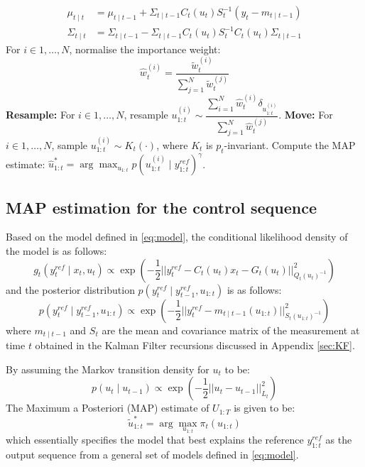 \begin{algorithm}
\begin{algorithmic}[1]
\begin{align}
  \mu_{t \mid t} &=   \mu_{t \mid t -1} +   \Sigma_{t \mid t -1} C_{t}(u_t)S_t^{-1}(y_t - m_{t \mid t-1}) \nonumber\\
  \Sigma_{t \mid t} &=  \Sigma_{t \mid t -1} -\Sigma_{t \mid t -1} C_{t}(u_t)S_t^{-1} C_{t}(u_t)\Sigma_{t \nonumber \mid t -1}
\end{align}
\State For $i \in 1, \ldots, N$, normalise the importance weight:
\begin{equation*}
\hat{w}^{(i)}_t = \dfrac{\tilde{w}^{(i)}_t}{\sum^N_{j=1} \tilde{w}^{(j)}_t}
\end{equation*}
\State \textbf{Resample:} For $i \in 1, \ldots, N$, resample $ u^{(i)}_{1:t} \sim \dfrac{\sum^N_{i=1}\hat{w}^{(i)}_t\delta_{u^{(i)}_{1:t}}}{\sum^N_{j=1} \hat{w}^{(j)}_t}$.
\State \textbf{Move:} For $i \in 1, \ldots, N$, sample $u^{(i)}_{1:t} \sim K_t(\cdot)$, where $K_t$ is $p_t$-invariant.
\EndWhile
\State Compute the MAP estimate: $\hat{u}^*_{1:t} =  \arg\max_{u_{1:t}} p(u^{(i)}_{1:t} \mid y^{ref}_{1:t})^\gamma$.
\EndFunction
\end{algorithmic}
\end{algorithm}

\subsection{MAP estimation for the control sequence}
Based on the model defined in \eqref{eq:model}, the conditional likelihood density of the model is as follows:
\begin{equation}
  g_t(y^{ref}_t \mid x_t, u_t) \propto \exp\left( -\dfrac{1}{2} \vert\vert y^{ref}_t - C_t(u_t)x_t - G_t(u_t) \vert\vert^2_{Q_t(u_t)^{-1}}\right)
\end{equation}
and the posterior distribution $p(y^{ref}_t \mid y^{ref}_{t-1}, u_{1:t})$ is as follows:
\begin{equation}
  p(y^{ref}_t \mid y^{ref}_{t-1}, u_{1:t}) \propto \exp\left( -\dfrac{1}{2} \vert\vert y^{ref}_t - m_{t \mid t-1}(u_{1:t}) \vert\vert^2_{S_t(u_{1:t})^{-1}}\right)
\end{equation}
where $m_{t \mid t-1}$ and $S_t$ are the mean and covariance matrix of the measurement at time $t$ obtained in the Kalman Filter recursions discussed in Appendix \ref{sec:KF}.

By assuming the Markov transition density for $u_t$ to be:
\begin{equation}
  p(u_{t} \mid u_{t-1}) \propto  \exp\left( -\dfrac{1}{2} \vert\vert u_t - u_{t-1} \vert\vert^2_{L_t}\right)
\label{eq:mctrans}
\end{equation}
The Maximum a Posteriori (MAP) estimate of $U_{1:T}$ is given to be:
\begin{equation}
  \tilde{u}^*_{1:t} = \arg\max_{u_{1:t}} \pi_t(u_{1:t})
\label{eq:map}
\end{equation}
which essentially specifies the model that best explains the reference $y^{ref}_{1:t}$ as the output sequence from a general set of models defined in \eqref{eq:model}.

